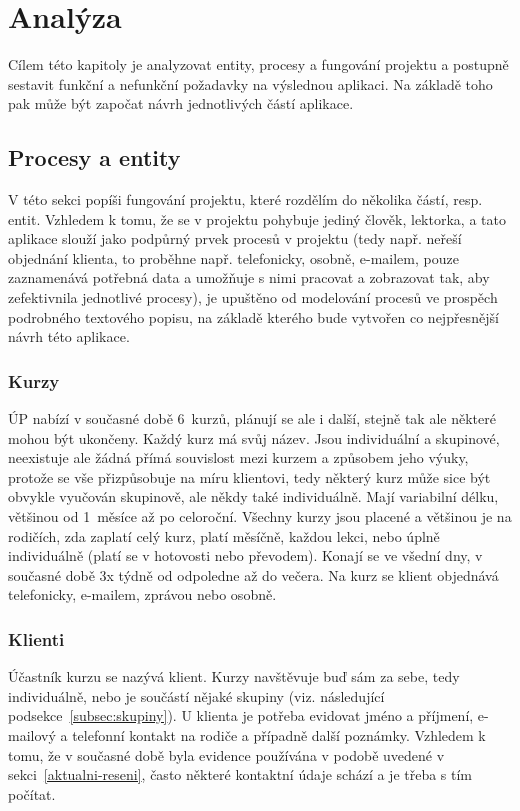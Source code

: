 \chapter{Analýza}
Cílem této kapitoly je analyzovat entity, procesy a fungování projektu a postupně sestavit funkční a nefunkční požadavky na výslednou aplikaci. Na základě toho pak může být započat návrh jednotlivých částí aplikace.
    
    \section{Procesy a entity}
    V této sekci popíši fungování projektu, které rozdělím do několika částí, resp. entit. Vzhledem k tomu, že se v projektu pohybuje jediný člověk, lektorka, a tato aplikace slouží jako podpůrný prvek procesů v projektu (tedy např. neřeší objednání klienta, to proběhne např. telefonicky, osobně, e-mailem, pouze zaznamenává potřebná data a umožňuje s nimi pracovat a zobrazovat tak, aby zefektivnila jednotlivé procesy), je upuštěno od modelování procesů ve prospěch podrobného textového popisu, na základě kterého bude vytvořen co nejpřesnější návrh této aplikace.
    
        \subsection{Kurzy}\label{subsec:kurzy}
        ÚP nabízí v současné době 6~kurzů, plánují se ale i další, stejně tak ale některé mohou být ukončeny. Každý kurz má svůj název. Jsou individuální a skupinové, neexistuje ale žádná přímá souvislost mezi kurzem a způsobem jeho výuky, protože se vše přizpůsobuje na míru klientovi, tedy některý kurz může sice být obvykle vyučován skupinově, ale někdy také individuálně. Mají variabilní délku, většinou od 1~měsíce až po celoroční. Všechny kurzy jsou placené a většinou je na rodičích, zda zaplatí celý kurz, platí měsíčně, každou lekci, nebo úplně individuálně (platí se v hotovosti nebo převodem). Konají se ve všední dny, v současné době 3x týdně od odpoledne až do večera. Na kurz se klient objednává telefonicky, e-mailem, zprávou nebo osobně.
        
        \subsection{Klienti}\label{subsec:klienti}
        Účastník kurzu se nazývá klient. Kurzy navštěvuje buď sám za sebe, tedy individuálně, nebo je součástí nějaké skupiny (viz. následující podsekce~\ref{subsec:skupiny}). U klienta je potřeba evidovat jméno a příjmení, e-mailový a telefonní kontakt na rodiče a případně další poznámky. Vzhledem k tomu, že v současné době byla evidence používána v podobě uvedené v sekci~\ref{aktualni-reseni}, často některé kontaktní údaje schází a je třeba s tím počítat.
        

